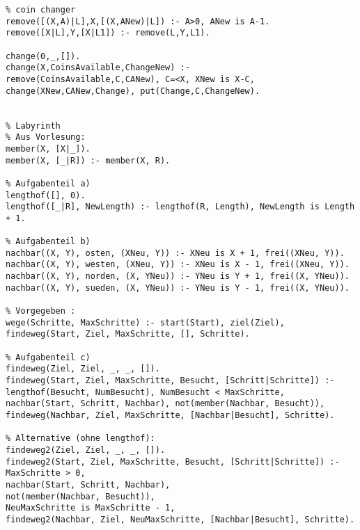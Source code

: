 \documentclass{article}
\begin{document}
\begin{verbatim}
% coin changer
remove([(X,A)|L],X,[(X,ANew)|L]) :- A>0, ANew is A-1.
remove([X|L],Y,[X|L1]) :- remove(L,Y,L1).

change(0,_,[]).
change(X,CoinsAvailable,ChangeNew) :- 
remove(CoinsAvailable,C,CANew), C=<X, XNew is X-C,
change(XNew,CANew,Change), put(Change,C,ChangeNew).


% Labyrinth
% Aus Vorlesung:
member(X, [X|_]).
member(X, [_|R]) :- member(X, R).

% Aufgabenteil a)
lengthof([], 0).
lengthof([_|R], NewLength) :- lengthof(R, Length), NewLength is Length + 1.

% Aufgabenteil b)
nachbar((X, Y), osten, (XNeu, Y)) :- XNeu is X + 1, frei((XNeu, Y)).
nachbar((X, Y), westen, (XNeu, Y)) :- XNeu is X - 1, frei((XNeu, Y)).
nachbar((X, Y), norden, (X, YNeu)) :- YNeu is Y + 1, frei((X, YNeu)).
nachbar((X, Y), sueden, (X, YNeu)) :- YNeu is Y - 1, frei((X, YNeu)).

% Vorgegeben :
wege(Schritte, MaxSchritte) :- start(Start), ziel(Ziel),
findeweg(Start, Ziel, MaxSchritte, [], Schritte).

% Aufgabenteil c)
findeweg(Ziel, Ziel, _, _, []).
findeweg(Start, Ziel, MaxSchritte, Besucht, [Schritt|Schritte]) :-
lengthof(Besucht, NumBesucht), NumBesucht < MaxSchritte,
nachbar(Start, Schritt, Nachbar), not(member(Nachbar, Besucht)),
findeweg(Nachbar, Ziel, MaxSchritte, [Nachbar|Besucht], Schritte).

% Alternative (ohne lengthof):
findeweg2(Ziel, Ziel, _, _, []).
findeweg2(Start, Ziel, MaxSchritte, Besucht, [Schritt|Schritte]) :-
MaxSchritte > 0,
nachbar(Start, Schritt, Nachbar),
not(member(Nachbar, Besucht)),
NeuMaxSchritte is MaxSchritte - 1,
findeweg2(Nachbar, Ziel, NeuMaxSchritte, [Nachbar|Besucht], Schritte).
\end{verbatim}
\end{document}
